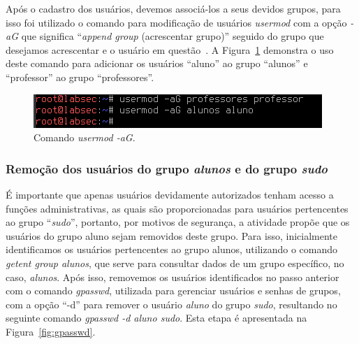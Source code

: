 \documentclass[
    12pt,				%
    oneside,   	        %
    a4paper,			%
    english,			%
    french,				%
    spanish,			%
    brazil,				%
    ]{pacotes/abntex2}
\begin{document}
Após o cadastro dos usuários, devemos associá-los a seus devidos grupos, para isso foi utilizado o comando para modificação de usuários \textit{usermod} com a opção \textit{-aG} que significa ``\textit{append group} (acrescentar grupo)'' seguido do grupo que desejamos acrescentar e o usuário em questão~\cite{negus2012}. A Figura~\ref{fig:usermod} demonstra o uso deste comando para adicionar os usuários ``aluno'' ao grupo ``alunos'' e ``professor'' ao grupo ``professores''. 

\begin{figure}[H]
  \centering
  \includegraphics[scale=0.8]{figuras/usermod.png}
  \caption{Comando \textit{usermod -aG}.}
  \label{fig:usermod}
\end{figure}

\subsubsection{Remoção dos usuários do grupo \textit{alunos} e do grupo \textit{sudo}}
É importante que apenas usuários devidamente autorizados tenham acesso a funções administrativas, as quais são proporcionadas para usuários pertencentes ao grupo ``\textit{sudo}'', portanto, por motivos de segurança, a atividade propõe que os usuários do grupo aluno sejam removidos deste grupo. Para isso, inicialmente identificamos os usuários pertencentes ao grupo alunos, utilizando o comando \textit{getent group alunos}, que serve para consultar dados de um grupo específico, no caso, \textit{alunos}. Após isso, removemos os usuários identificados no passo anterior com o comando \textit{gpasswd}, utilizada para gerenciar usuários e senhas de grupos, com a opção ``-d'' para remover o usuário \textit{aluno} do grupo \textit{sudo}, resultando no seguinte comando \textit{gpasswd -d aluno sudo}. Esta etapa é apresentada na Figura~\ref{fig:gpasswd}.
\end{document}
